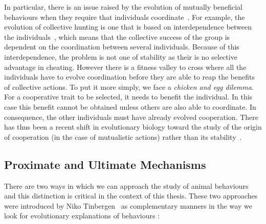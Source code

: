 

    In particular, there is an issue raised by the evolution of mutually beneficial behaviours when they require that individuals coordinate~\parencite{Alvard2002, Alvard2003, Leimar2003, Drea2009a}. For example, the evolution of collective hunting is one that is based on interdependence between the individuals~\parencite{Tomasello2012}, which means that the collective success of the group is dependent on the coordination between several individuals. Because of this interdependence, the problem is not one of stability as their is no selective advantage in cheating. However there is a fitness valley to cross where all the individuals have to evolve coordination before they are able to reap the benefits of collective actions. To put it more simply, we face a \emph{chicken and egg dilemma}. For a cooperative trait to be selected, it needs to benefit the individual. In this case this benefit cannot be obtained unless others are also able to coordinate. In consequence, the other individuals must have already evolved cooperation. There has thus been a recent shift in evolutionary biology toward the study of the origin of cooperation (in the case of mutualistic actions) rather than its stability~\parencite{Forber2015}.


  \subsection{Proximate and Ultimate Mechanisms}

    There are two ways in which we can approach the study of animal behaviours and this distinction is critical in the context of this thesis. These two approaches were introduced by Niko Tinbergen~\parencite{Tinbergen1963, West2007a} as complementary manners in the way we look for evolutionary explanations of behaviours :

